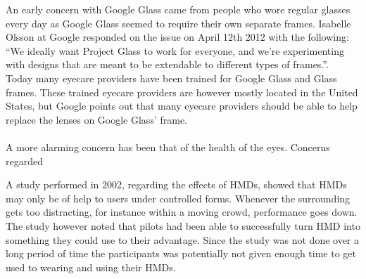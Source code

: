 An early concern with Google Glass came from people who wore regular glasses every day as Google Glass seemed to require their own separate frames. Isabelle Olsson at Google responded on the issue on April 12th 2012 with the following: ``We ideally want Project Glass to work for everyone, and we're experimenting with designs that are meant to be extendable to different types of frames.''.\cite{GoogleGlassFrameResponse}\\

Today many eyecare providers have been trained for Google Glass and Glass frames. These trained eyecare providers are however mostly located in the United States,\cite{frameProviders} but Google points out that many eyecare providers should be able to help replace the lenses on Google Glass' frame\cite{framesGlass}.\\ 


\cite{ackerman13}\\
A more alarming concern has been that of the health of the eyes. Concerns regarded



A study performed in 2002\cite{laramee02}, regarding the effects of HMDs, showed that HMDs may only be of help to users under controlled forms. Whenever the surrounding gets too distracting, for instance within a moving crowd, performance goes down. The study however noted that pilots had been able to successfully turn HMD into something they could use to their advantage. Since the study was not done over a long period of time the participants was potentially not given enough time to get used to wearing and using their HMDs.\\

